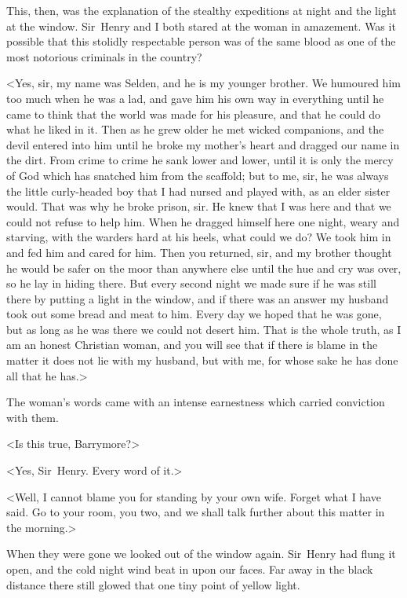 This, then, was the explanation of the stealthy expeditions at night and the light at the window. Sir~Henry and I both stared at the woman in amazement. Was it possible that this stolidly respectable person was of the same blood as one of the most notorious criminals in the country?

<Yes, sir, my name was Selden, and he is my younger brother. We humoured him too much when he was a lad, and gave him his own way in everything until he came to think that the world was made for his pleasure, and that he could do what he liked in it. Then as he grew older he met wicked companions, and the devil entered into him until he broke my mother's heart and dragged our name in the dirt. From crime to crime he sank lower and lower, until it is only the mercy of God which has snatched him from the scaffold; but to me, sir, he was always the little curly-headed boy that I had nursed and played with, as an elder sister would. That was why he broke prison, sir. He knew that I was here and that we could not refuse to help him. When he dragged himself here one night, weary and starving, with the warders hard at his heels, what could we do? We took him in and fed him and cared for him. Then you returned, sir, and my brother thought he would be safer on the moor than anywhere else until the hue and cry was over, so he lay in hiding there. But every second night we made sure if he was still there by putting a light in the window, and if there was an answer my husband took out some bread and meat to him. Every day we hoped that he was gone, but as long as he was there we could not desert him. That is the whole truth, as I am an honest Christian woman, and you will see that if there is blame in the matter it does not lie with my husband, but with me, for whose sake he has done all that he has.>

The woman's words came with an intense earnestness which carried conviction with them.

<Is this true, Barrymore?>

<Yes, Sir~Henry. Every word of it.>

<Well, I cannot blame you for standing by your own wife. Forget what I have said. Go to your room, you two, and we shall talk further about this matter in the morning.>

When they were gone we looked out of the window again. Sir~Henry had flung it open, and the cold night wind beat in upon our faces. Far away in the black distance there still glowed that one tiny point of yellow light.

